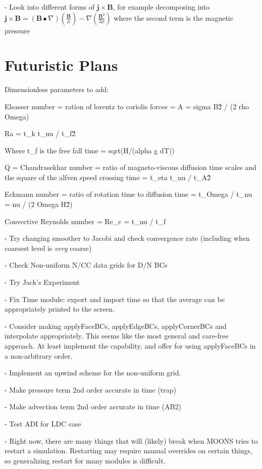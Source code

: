 \documentclass[11pt]{article}
\begin{document}
- Look into different forms of $\mathbf{j}\times \mathbf{B}$, for example 
decomposing into $\mathbf{j}\times \mathbf{B} = (\mathbf{B}\bullet\nabla) \left(\frac{\mathbf{B}}{\mu}\right) - \nabla \left( \frac{\mathbf{B}^2}{2\mu} \right)$ where the second term is the magnetic pressure

\section{Futuristic Plans}

Dimensionless parameters to add:

Elsasser number = ration of lorentz to coriolis forces = A = sigma B\^2 / (2 rho Omega)

Ra = t\_k t\_nu / t\_f\^2

Where t\_f is the free fall time = sqrt(H/(alpha g dT))

Q = Chandrasekhar number = ratio of magneto-viscous diffusion time scales and the square of the alfven speed crossing time
 = t\_eta t\_nu / t\_A\^2

Eckmann number = ratio of rotation time to diffusion time
 = t\_Omega / t\_nu = nu / (2 Omega H\^2)


Convective Reynolds number = Re\_c = t\_nu / t\_f

- Try changing smoother to Jacobi and check convergence rate (including when coarsest level is \textit{very} coarse)

- Check Non-uniform N/CC data grids for D/N BCs

- Try Jack's Experiment

- Fix Time module: export and import time so that the average can be appropriately
printed to the screen.

- Consider making applyFaceBCs, applyEdgeBCs, applyCornerBCs and interpolate appropriately. This seems like the most general and care-free approach. At least implement the capability, and offer for using applyFaceBCs in a non-arbitrary order.

- Implement an upwind scheme for the non-uniform grid.

- Make pressure term 2nd order accurate in time (trap)

- Make advection term 2nd order accurate in time (AB2)

- Test ADI for LDC case

- Right now, there are many things that will (likely) break when MOONS tries to restart a simulation. Restarting may require manual overrides on certain things, so generalizing restart for many modules is difficult.
\end{document}
